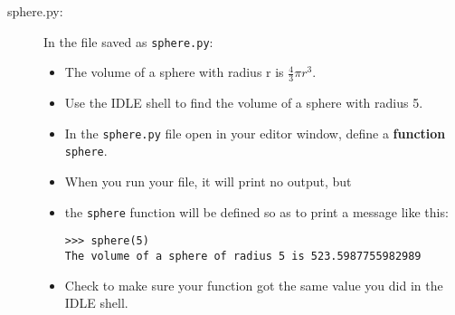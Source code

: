 \documentclass[12pt]{article}
\begin{document}
\begin{description}
\item[sphere.py:] In the file saved as \verb|sphere.py|:
\begin{itemize}
\item
The volume of a sphere with radius r is $\frac{4}{3} \pi r^3$.
\item
Use the IDLE shell to find the volume of a sphere with radius 5.
\item
In the \verb|sphere.py| file open in your editor window,
define a {\bf function} \verb|sphere|.
\item When you run your file, it will print no output, but
\item the \verb|sphere| function will be defined
so as to print a message like this:
\begin{lstlisting}
>>> sphere(5)
The volume of a sphere of radius 5 is 523.5987755982989
\end{lstlisting}
\item Check to make sure your function got the same
value you did in the IDLE shell.
\end{itemize}


\end{description}
\end{document}
